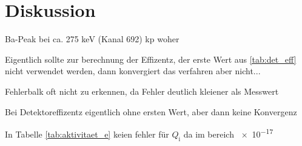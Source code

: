 \section{Diskussion}
\label{sec:Diskussion}
Ba-Peak bei ca. 275 keV (Kanal 692) kp woher

Eigentlich sollte zur berechnung der Effizentz, der erste Wert aus \ref{tab:det_eff} nicht verwendet werden, dann konvergiert das verfahren aber nicht...

Fehlerbalk oft nicht zu erkennen, da Fehler deutlich kleiener als Messwert

Bei Detektoreffizentz eigentlich ohne ersten Wert, aber dann keine Konvergenz

In Tabelle \ref{tab:aktivitaet_e} keien fehler für $Q_\text{i}$ da im bereich \num{e-17}